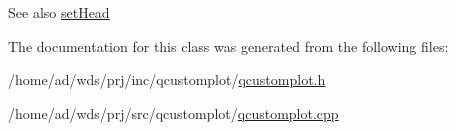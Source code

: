 \begin{DoxySeeAlso}{See also}
\hyperlink{class_q_c_p_item_curve_a08a30d9cdd63995deea3d9e20430676f}{set\+Head} 
\end{DoxySeeAlso}


The documentation for this class was generated from the following files\+:\begin{DoxyCompactItemize}
\item 
/home/ad/wds/prj/inc/qcustomplot/\hyperlink{qcustomplot_8h}{qcustomplot.\+h}\item 
/home/ad/wds/prj/src/qcustomplot/\hyperlink{qcustomplot_8cpp}{qcustomplot.\+cpp}\end{DoxyCompactItemize}
